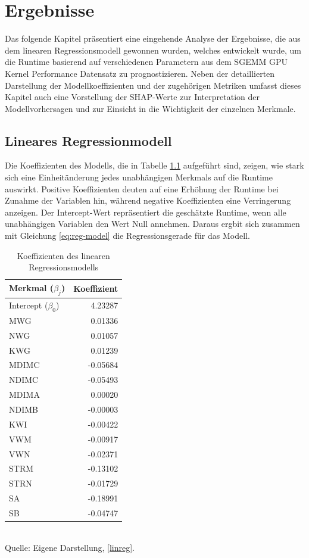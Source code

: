 \chapter{Ergebnisse}
\label{chapter:results}

Das folgende Kapitel präsentiert eine eingehende Analyse der Ergebnisse, 
die aus dem linearen Regressionsmodell gewonnen wurden, welches entwickelt wurde, 
um die Runtime basierend auf verschiedenen Parametern aus dem SGEMM GPU Kernel Performance 
Datensatz zu prognostizieren. Neben der detaillierten Darstellung der Modellkoeffizienten und 
der zugehörigen Metriken umfasst dieses Kapitel auch eine Vorstellung der SHAP-Werte 
zur Interpretation der Modellvorhersagen und zur Einsicht in die Wichtigkeit der einzelnen Merkmale.

\section{Lineares Regressionmodell}

Die Koeffizienten des Modells, die in 
Tabelle \ref{tab:model-coefficients} aufgeführt sind, zeigen, wie stark sich eine 
Einheitänderung jedes unabhängigen Merkmals auf die Runtime auswirkt. 
Positive Koeffizienten deuten auf eine Erhöhung der Runtime bei Zunahme der Variablen hin, 
während negative Koeffizienten eine Verringerung anzeigen. Der Intercept-Wert repräsentiert 
die geschätzte Runtime, wenn alle unabhängigen Variablen den Wert Null annehmen. Daraus ergbit sich
zusammen mit Gleichung \ref{eq:reg-model} die Regressionsgerade für das Modell.

\begin{table}[!h]
    \caption{Koeffizienten des linearen Regressionsmodells}
    \begin{tabularx}{\textwidth}{Xr}
    \toprule
    Merkmal ($\beta_j$) & Koeffizient \\
    \midrule
    Intercept ($\beta_0$) & 4.23287 \\
    MWG & 0.01336 \\
    NWG & 0.01057 \\
    KWG & 0.01239 \\
    MDIMC & -0.05684 \\
    NDIMC & -0.05493 \\
    MDIMA & 0.00020 \\
    NDIMB & -0.00003 \\
    KWI & -0.00422 \\
    VWM & -0.00917 \\
    VWN & -0.02371 \\
    STRM & -0.13102 \\
    STRN & -0.01729 \\
    SA & -0.18991 \\
    SB & -0.04747 \\
    \bottomrule
    \end{tabularx}
    \label{tab:model-coefficients}
    \\ Quelle: Eigene Darstellung, \ref{linreg}.
\end{table}

